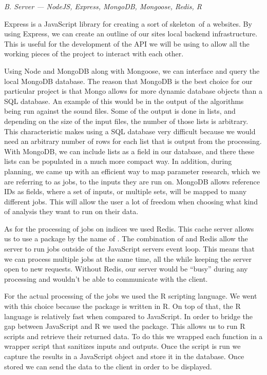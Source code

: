 \begin{flushleft}
\noindent\textit{B. Server --- NodeJS, Express, MongoDB, Mongoose, Redis, R}\par
Express is a JavaScript library for creating a sort of \textquotesingle skeleton\textquotesingle\ of a website\textquotesingle s. By using Express, we can create an outline of our site\textquotesingle s local backend infrastructure. This is useful for the development of the API we will be using to allow all the working pieces of the project to interact with each other.\par
Using Node and MongoDB along with Mongoose, we can interface and query the local MongoDB database. The reason that MongoDB is the best choice for our particular project is that Mongo allows for more dynamic database objects than a SQL database. An example of this would be in the output of the algorithms being run against the sound files. Some of the output is done in lists, and depending on the size of the input files, the number of those lists is arbitrary. This characteristic makes using a SQL database very difficult because we would need an arbitrary number of rows for each list that is output from the processing. With MongoDB, we can include lists as a field in our database, and there these lists can be populated in a much more compact way. In addition, during planning, we came up with an efficient way to map parameter research, which we are referring to as jobs, to the inputs they are run on. MongoDB allows reference IDs as fields, where a set of inputs, or multiple sets, will be mapped to many different jobs. This will allow the user a lot of freedom when choosing what kind of analysis they want to run on their data.\par
As for the processing of jobs on indices we used Redis. This cache server allows us to use a package by the name of . The combination of  and Redis allow the server to run jobs outside of the JavaScript server\textquotesingle s event loop. This means that we can process multiple jobs at the same time, all the while keeping the server open to new requests. Without Redis, our server would be ``busy'' during any processing and wouldn't be able to communicate with the client.\par
For the actual processing of the jobs we used the R scripting language. We went with this choice because the  package is written in R. On top of that, the R language is relatively fast when compared to JavaScript. In order to bridge the gap between JavaScript and R we used the  package. This allows us to run R scripts and retrieve their returned data. To do this we wrapped each  function in a wrapper script that sanitizes inputs and outputs. Once the script is run we capture the results in a JavaScript object and store it in the database. Once stored we can send the data to the client in order to be displayed.\par

\end{flushleft}
